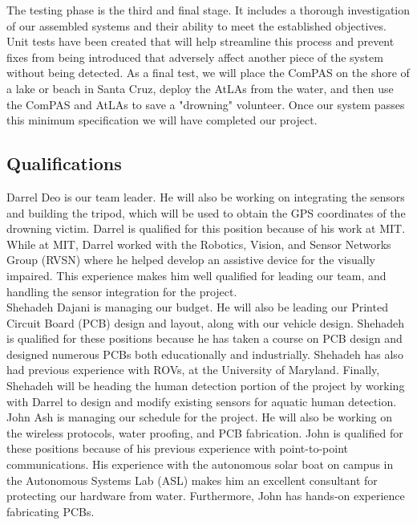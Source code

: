 \documentclass[11pt]{article}
\begin{document}
The testing phase is the third and final stage. It includes a thorough investigation of our assembled systems and their ability to meet the established objectives. Unit tests have been created that will help streamline this process and prevent fixes from being introduced that adversely affect another piece of the system without being detected. As a final test, we will place the ComPAS on the shore of a lake or beach in Santa Cruz, deploy the AtLAs from the water, and then use the ComPAS and AtLAs to save a "drowning" volunteer. Once our system passes this minimum specification we will have completed our project.

\subsection*{Qualifications}

Darrel Deo is our team leader. He will also be working on integrating the sensors and building the tripod, which will be used to obtain the GPS coordinates of the drowning victim. Darrel is qualified for this position because of his work at MIT. While at MIT, Darrel worked with the Robotics, Vision, and Sensor Networks Group (RVSN) where he helped develop an assistive device for the visually impaired. This experience makes him well qualified for leading our team, and handling the sensor integration for the project.\\

Shehadeh Dajani is managing our budget. He will also be leading our Printed Circuit Board (PCB) design and layout, along with our vehicle design. Shehadeh is qualified for these positions because he has taken a course on PCB design and designed numerous PCBs both educationally and industrially. Shehadeh has also had previous experience with ROVs, at the University of Maryland. Finally, Shehadeh will be heading the human detection portion of the project by working with Darrel to design and modify existing sensors for aquatic human detection.\\

John Ash is managing our schedule for the project. He will also be working on the wireless protocols, water proofing, and PCB fabrication. John is qualified for these positions because of his previous experience with point-to-point communications. His experience with the autonomous solar boat on campus in the Autonomous Systems Lab (ASL) makes him an excellent consultant for protecting our hardware from water. Furthermore, John has hands-on experience fabricating PCBs.\\
\end{document}
